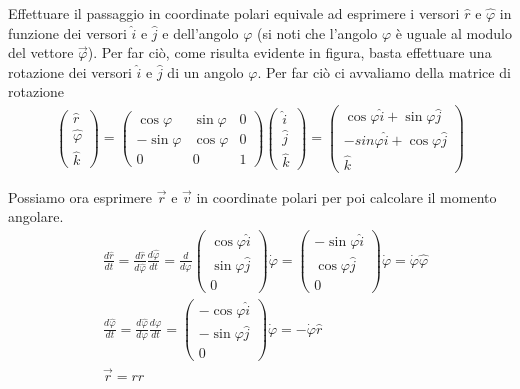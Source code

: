 Effettuare il passaggio in coordinate polari equivale ad esprimere i versori $\hat{r}$ e $\hat{\varphi}$ in funzione dei versori $\hat{i}$ e $\hat{j}$ e dell'angolo $\varphi$ (si noti che l'angolo $\varphi$ è uguale al modulo del vettore $\vec{\varphi}$). Per far ciò, come risulta evidente in figura, basta effettuare una rotazione dei versori $\hat{i}$ e $\hat{j}$ di un angolo $\varphi$. Per far ciò ci avvaliamo della matrice di rotazione
\begin{align*}
		\begin{pmatrix}
		\hat{r}\\
		\hat{\varphi}\\
		\hat{k}
	\end{pmatrix}=
	\begin{pmatrix}
		\cos\varphi&\sin\varphi&0\\
		-\sin\varphi&\cos\varphi&0\\
		0&0&1
	\end{pmatrix}
	\begin{pmatrix}
		\hat{i}\\
		\hat{j}\\
		\hat{k}
	\end{pmatrix}=
	\begin{pmatrix}
	\cos\varphi \hat{i} + \sin\varphi\hat{j}\\
	-sin\varphi \hat{i}+\cos\varphi\hat{j}\\
	\hat{k}
\end{pmatrix}\\\\
\end{align*}
Possiamo ora esprimere $\vec{r}$ e $\vec{v}$ in coordinate polari per poi calcolare il momento angolare.
\begin{align*}
&\frac{d\hat{r}}{dt} = \frac{d\hat{r}}{d\hat{\varphi}}\frac{d\hat{\varphi}}{dt} = \frac{d}{d\varphi}
\begin{pmatrix}
	\cos\varphi\hat{i}\\
	\sin\varphi	\hat{j}\\
	0
\end{pmatrix}
\dot{\varphi} = 
\begin{pmatrix}
	-\sin\varphi\hat{i}\\
	\cos\varphi	\hat{j}\\
	0
\end{pmatrix}
\dot{\varphi} = \dot{\varphi}\hat{\varphi}\\ \nonumber
&\frac{d\hat{\varphi}}{dt} = \frac{d\hat{\varphi}}{d\varphi}\frac{d\varphi}{dt} = \begin{pmatrix}
	-\cos\varphi\hat{i}\\
	-\sin\varphi	\hat{j}\\
	0
\end{pmatrix} \dot{\varphi} = -\dot{\varphi}\hat{r}\\ \nonumber
&\vec{r}= r\hat{r} 
\end{align*}

